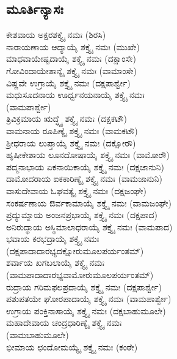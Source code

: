 \subsection{ಮೂರ್ತಿನ್ಯಾಸಃ}
 ಕೇಶವಾಯ ಅಕ್ಷರಶಕ್ತ್ಯೈ ನಮಃ (ಶಿರಸಿ)\\
 ನಾರಾಯಣಾಯ ಆದ್ಯಾಯೈ ಶಕ್ತ್ಯೈ ನಮಃ (ಮುಖೇ)\\
 ಮಾಧವಾಯೇಷ್ಟದಾಯೈ ಶಕ್ತ್ಯೈ ನಮಃ (ದಕ್ಷಾಂಸೇ)\\
 ಗೋವಿಂದಾಯೇಶಾನ್ಯೈ ಶಕ್ತ್ಯೈ ನಮಃ (ವಾಮಾಂಸೇ)\\
 ವಿಷ್ಣವೇ ಉಗ್ರಾಯೈ ಶಕ್ತ್ಯೈ ನಮಃ (ದಕ್ಷಪಾರ್ಶ್ವೇ)\\
 ಮಧುಸೂದನಾಯ ಊರ್ಧ್ವನಯನಾಯೈ ಶಕ್ತ್ಯೈ ನಮಃ\\ (ವಾಮಪಾರ್ಶ್ವೇ)\\
 ತ್ರಿವಿಕ್ರಮಾಯ ಋದ್ಧ್ಯೈ ಶಕ್ತ್ಯೈ ನಮಃ (ದಕ್ಷಕಟೌ)\\
 ವಾಮನಾಯ ರೂಪಿಣ್ಯೈ ಶಕ್ತ್ಯೈ ನಮಃ (ವಾಮಕಟೌ)\\
 ಶ್ರೀಧರಾಯ ಲುಪ್ತಾಯೈ ಶಕ್ತ್ಯೈ ನಮಃ (ದಕ್ಷೋರೌ)\\
 ಹೃಷೀಕೇಶಾಯ ಲೂನದೋಷಾಯೈ ಶಕ್ತ್ಯೈ ನಮಃ (ವಾಮೋರೌ)\\
 ಪದ್ಮನಾಭಾಯ ಏಕನಾಯಿಕಾಯೈ ಶಕ್ತ್ಯೈ ನಮಃ (ದಕ್ಷಜಾನುನಿ)\\
 ದಾಮೋದರಾಯ ಐಕಕಾರಿಣ್ಯೈ ಶಕ್ತ್ಯೈ ನಮಃ (ವಾಮಜಾನುನಿ)\\
 ವಾಸುದೇವಾಯ ಓಘವತ್ಯೈ ಶಕ್ತ್ಯೈ ನಮಃ (ದಕ್ಷಜಂಘೇ)\\
 ಸಂಕರ್ಷಣಾಯ ಔರ್ವಕಾಮಾಯೈ ಶಕ್ತ್ಯೈ ನಮಃ (ವಾಮಜಂಘೇ)\\
 ಪ್ರದ್ಯುಮ್ನಾಯ ಅಂಜನಪ್ರಭಾಯೈ ಶಕ್ತ್ಯೈ ನಮಃ (ದಕ್ಷಪಾದ)\\
 ಅನಿರುದ್ಧಾಯ ಅಸ್ಥಿಮಾಲಾಧರಾಯೈ ಶಕ್ತ್ಯೈ ನಮಃ (ವಾಮಪಾದ)\\
 ಭವಾಯ ಕರಭದ್ರಾಯೈ ಶಕ್ತ್ಯೈ ನಮಃ \\(ದಕ್ಷಪಾದಾದಾರಭ್ಯದಕ್ಷೋರುಮೂಲಪರ್ಯಂತಮ್)\\
 ಶರ್ವಾಯ ಖಗಬಲಾಯೈ ಶಕ್ತ್ಯೈ ನಮಃ \\(ವಾಮಪಾದಾದಾರಭ್ಯವಾಮೋರುಮೂಲಪರ್ಯಂತಮ್)\\
 ರುದ್ರಾಯ ಗರಿಮಫಲಪ್ರದಾಯೈ ಶಕ್ತ್ಯೈ ನಮಃ (ದಕ್ಷಪಾರ್ಶ್ವೇ)\\
 ಪಶುಪತಯೇ ಘೋರಪಾದಾಯೈ ಶಕ್ತ್ಯೈ ನಮಃ (ವಾಮಪಾರ್ಶ್ವೇ)\\
 ಉಗ್ರಾಯ ಪಂಕ್ತಿನಾಸಾಯೈ ಶಕ್ತ್ಯೈ ನಮಃ (ದಕ್ಷಬಾಹುಮೂಲೇ)\\
 ಮಹಾದೇವಾಯ ಚಂದ್ರಧಾರಿಣ್ಯೈ ಶಕ್ತ್ಯೈ ನಮಃ\\ (ವಾಮಬಾಹುಮೂಲೇ)\\
 ಭೀಮಾಯ ಛಂದೋಮಯ್ಯೈ ಶಕ್ತ್ಯೈ ನಮಃ (ಕಂಠೇ)\\
